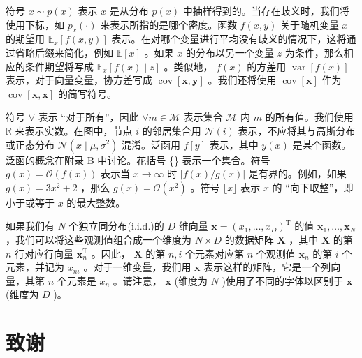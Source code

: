 \documentclass[10pt]{article}
\begin{document}
符号 \(x \sim  p\left( x\right)\) 表示 \(x\) 是从分布 \(p\left( x\right)\) 中抽样得到的。当存在歧义时，我们将使用下标，如 \({p}_{x}\left( \cdot \right)\) 来表示所指的是哪个密度。函数 \(f\left( {x,y}\right)\) 关于随机变量 \(x\) 的期望用 \({\mathbb{E}}_{x}\left\lbrack  {f\left( {x,y}\right) }\right\rbrack\) 表示。在对哪个变量进行平均没有歧义的情况下，这将通过省略后缀来简化，例如 \(\mathbb{E}\left\lbrack  x\right\rbrack\) 。如果 \(x\) 的分布以另一个变量 \(z\) 为条件，那么相应的条件期望将写成 \({\mathbb{E}}_{x}\left\lbrack  {f\left( x\right)  \mid  z}\right\rbrack\) 。类似地， \(f\left( x\right)\) 的方差用 \(\operatorname{var}\left\lbrack  {f\left( x\right) }\right\rbrack\) 表示，对于向量变量，协方差写成 \(\operatorname{cov}\left\lbrack  {\mathbf{x},\mathbf{y}}\right\rbrack\) 。我们还将使用 \(\operatorname{cov}\left\lbrack  \mathbf{x}\right\rbrack\) 作为 \(\operatorname{cov}\left\lbrack  {\mathbf{x},\mathbf{x}}\right\rbrack\) 的简写符号。

符号 \(\forall\) 表示 “对于所有”，因此 \(\forall m \in  \mathcal{M}\) 表示集合 \(\mathcal{M}\) 内 \(m\) 的所有值。我们使用 \(\mathbb{R}\) 来表示实数。在图中，节点 \(i\) 的邻居集合用 \(\mathcal{N}\left( i\right)\) 表示，不应将其与高斯分布或正态分布 \(\mathcal{N}\left( {x \mid  \mu ,{\sigma }^{2}}\right)\) 混淆。泛函用 \(f\left\lbrack  y\right\rbrack\) 表示，其中 \(y\left( x\right)\) 是某个函数。泛函的概念在附录 B 中讨论。花括号 \{\} 表示一个集合。符号 \(g\left( x\right)  = \mathcal{O}\left( {f\left( x\right) }\right)\) 表示当 \(x \rightarrow  \infty\) 时 \(\left| {f\left( x\right) /g\left( x\right) }\right|\) 是有界的。例如，如果 \(g\left( x\right)  = 3{x}^{2} + 2\) ，那么 \(g\left( x\right)  = \mathcal{O}\left( {x}^{2}\right)\) 。符号 \(\lfloor x\rfloor\) 表示 \(x\) 的 “向下取整”，即小于或等于 \(x\) 的最大整数。

如果我们有 \(N\) 个独立同分布(i.i.d.)的 \(D\) 维向量 \(\mathbf{x} = {\left( {x}_{1},\ldots ,{x}_{D}\right) }^{\mathrm{T}}\) 的值 \({\mathbf{x}}_{1},\ldots ,{\mathbf{x}}_{N}\) ，我们可以将这些观测值组合成一个维度为 \(N \times  D\) 的数据矩阵 \(\mathbf{X}\) ，其中 \(\mathbf{X}\) 的第 \(n\) 行对应行向量 \({\mathbf{x}}_{n}^{\mathrm{T}}\) 。因此， \(\mathbf{X}\) 的第 \(n,i\) 个元素对应第 \(n\) 个观测值 \({\mathbf{x}}_{n}\) 的第 \(i\) 个元素，并记为 \({x}_{ni}\) 。对于一维变量，我们用 \(\mathbf{x}\) 表示这样的矩阵，它是一个列向量，其第 \(n\) 个元素是 \({x}_{n}\) 。请注意， \(\mathbf{x}\) (维度为 \(N\) )使用了不同的字体以区别于 \(\mathbf{x}\) (维度为 \(D\) )。

\section*{致谢}
\end{document}
